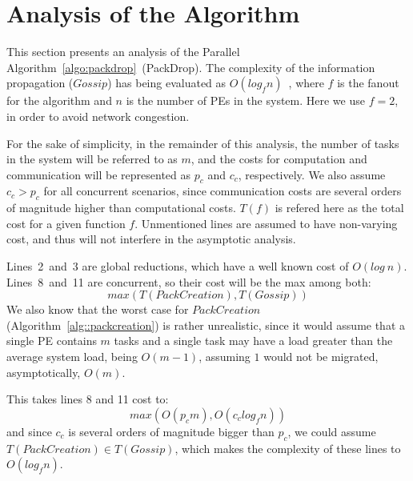 \section{Analysis of the Algorithm}

This section presents an analysis of the Parallel Algorithm~\ref{algo:packdrop}~(PackDrop). 
The complexity of the information propagation ($Gossip$) has being evaluated as $O(log_fn)$~\cite{grapevine},
where $f$ is the fanout for the algorithm and $n$ is the number of PEs in the system.
Here we use $f=2$, in order to avoid network congestion. %

For the sake of simplicity, in the remainder of this analysis, the number of tasks in the system
will be referred to as $m$, and the costs for computation and communication will be represented as $p_c$ and $c_c$, respectively.
We also assume $c_c > p_c$ for all concurrent scenarios, since communication costs are several orders of magnitude higher than computational costs.
$T(f)$ is refered here as the total cost for a given function $f$.
Unmentioned lines are assumed to have non-varying cost, and thus will not interfere in the asymptotic analysis.

Lines~2~and~3 are global reductions, which have a well known cost of $O(log\ n)$.
Lines~8~and~11 are concurrent, so their cost will be the max among both:
\begin{equation}
  max(T(PackCreation),T(Gossip))
\end{equation}
We also know that the worst case for $PackCreation$ (Algorithm~\ref{alg::packcreation}) is rather unrealistic, 
since it would assume that a single PE contains $m$ tasks and a single task may have a load greater than the average system load, being $O(m-1)$, assuming $1$ would not be migrated, asymptotically, $O(m)$.


This takes lines 8 and 11 cost to:
\begin{equation}
 max(O(p_cm),O(c_clog_fn))
\end{equation}
and since $c_c$ is several orders of magnitude bigger than $p_c$, we could assume $T(PackCreation)\in T(Gossip)$, which makes the 
complexity of these lines to $O(log_fn)$.

